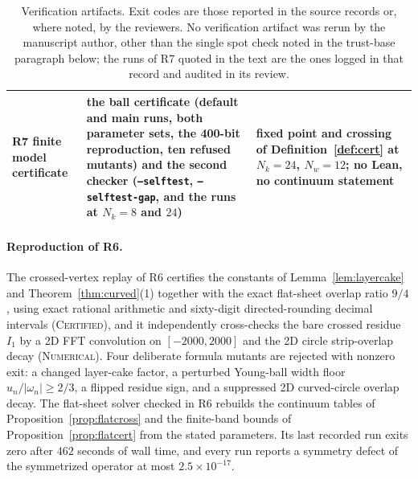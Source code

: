 \documentclass[11pt]{article}
\newcommand{\CERT}{\upshape\mdseries\textsc{Certified}}
\newcommand{\NUM}{\upshape\mdseries\textsc{Numerical}}
\theoremstyle{definition}
\theoremstyle{remark}
\begin{document}
\begin{table}[t]
\begin{tabular}{@{}>{\raggedright\arraybackslash}p{2.9cm}>{\raggedright\arraybackslash}p{5.1cm}>{\raggedright\arraybackslash}p{5.0cm}@{}}
R7 finite model certificate & the ball certificate (default and main runs, both parameter sets, the 400-bit reproduction, ten refused mutants) and the second checker (\texttt{--selftest}, \texttt{--selftest-gap}, and the runs at $N_k=8$ and $24$) & fixed point and crossing of Definition~\ref{def:cert} at $N_k=24$, $N_w=12$; no Lean, no continuum statement\\\bottomrule
\end{tabular}
\caption{Verification artifacts. Exit codes are those reported in the source records or, where noted, by the reviewers. No verification artifact was rerun by the manuscript author, other than the single spot check noted in the trust-base paragraph below; the runs of R7 quoted in the text are the ones logged in that record and audited in its review.}\label{tab:verify}
\end{table}

\paragraph{Reproduction of R6.} The crossed-vertex replay of R6 certifies the constants of Lemma~\ref{lem:layercake} and Theorem~\ref{thm:curved}(1) together with the exact flat-sheet overlap ratio $9/4$, using exact rational arithmetic and sixty-digit directed-rounding decimal intervals (\CERT), and it independently cross-checks the bare crossed residue $I_1$ by a 2D FFT convolution on $[-2000,2000]$ and the 2D circle strip-overlap decay (\NUM). Four deliberate formula mutants are rejected with nonzero exit: a changed layer-cake factor, a perturbed Young-ball width floor $u_n/|\omega_n|\ge2/3$, a flipped residue sign, and a suppressed 2D curved-circle overlap decay. The flat-sheet solver checked in R6 rebuilds the continuum tables of Proposition~\ref{prop:flatcross} and the finite-band bounds of Proposition~\ref{prop:flatcert} from the stated parameters. Its last recorded run exits zero after $462$ seconds of wall time, and every run reports a symmetry defect of the symmetrized operator at most $2.5\times10^{-17}$.
\end{document}
